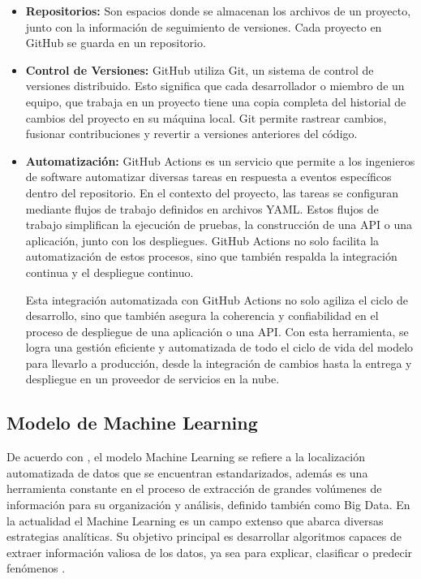 \begin{itemize}
	\item \textbf{Repositorios:} Son espacios donde se almacenan los archivos de un proyecto,  junto  con  la  información  de  seguimiento  de  versiones.  Cada  proyecto  en GitHub se guarda en un repositorio.
	\item \textbf{Control de Versiones:} GitHub utiliza Git, un sistema de control de versiones distribuido. Esto significa que cada desarrollador o miembro de un equipo, que trabaja en un proyecto tiene una copia completa del historial de cambios del proyecto en su  máquina  local.  Git  permite  rastrear  cambios,  fusionar  contribuciones  y  revertir  a versiones anteriores del código.
	\item \textbf{Automatización:} GitHub Actions es un servicio que permite a los ingenieros de software automatizar diversas tareas en respuesta a eventos específicos dentro del repositorio. En el contexto del proyecto, las tareas se configuran mediante flujos de trabajo definidos en archivos YAML. Estos flujos de trabajo simplifican la ejecución de pruebas, la construcción de una API o una aplicación, junto con los despliegues. GitHub Actions no solo facilita la automatización de estos procesos, sino que también respalda la integración continua y el despliegue continuo.
	
	Esta integración automatizada con GitHub Actions no solo agiliza el ciclo de desarrollo, sino que también asegura la coherencia y confiabilidad en el proceso de despliegue de una aplicación o una API. Con esta herramienta, se logra una gestión eficiente y automatizada de todo el ciclo de vida del modelo para llevarlo a producción, desde la integración de cambios hasta la entrega y despliegue en un proveedor de servicios en la nube.
\end{itemize}

\subsection{Modelo de Machine Learning}

De acuerdo con \cite{salamanca2021}, el modelo Machine Learning se refiere a la localización automatizada de datos que se encuentran estandarizados, además es una herramienta constante en el proceso de extracción de grandes volúmenes de información para su organización y análisis, definido también como Big Data. En la actualidad el Machine Learning es un campo extenso que abarca diversas estrategias analíticas. Su objetivo principal es desarrollar algoritmos capaces de extraer información valiosa de los datos, ya sea para explicar, clasificar o predecir fenómenos \citep{pedro2021}.

